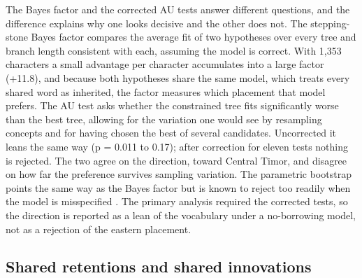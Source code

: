 \documentclass[11pt]{article}
\begin{document}
The Bayes factor and the corrected AU tests answer different questions, and the difference explains why one looks decisive and the other does not. The stepping-stone Bayes factor compares the average fit of two hypotheses over every tree and branch length consistent with each, assuming the model is correct. With 1,353 characters a small advantage per character accumulates into a large factor (+11.8), and because both hypotheses share the same model, which treats every shared word as inherited, the factor measures which placement that model prefers. The AU test asks whether the constrained tree fits significantly worse than the best tree, allowing for the variation one would see by resampling concepts and for having chosen the best of several candidates. Uncorrected it leans the same way (p = 0.011 to 0.17); after correction for eleven tests nothing is rejected. The two agree on the direction, toward Central Timor, and disagree on how far the preference survives sampling variation. The parametric bootstrap \citep[the Swofford--Olsen--Waddell--Hillis or SOWH test;][]{goldman2000} points the same way as the Bayes factor but is known to reject too readily when the model is misspecified \citep{buckley2002,susko2014}. The primary analysis required the corrected tests, so the direction is reported as a lean of the vocabulary under a no-borrowing model, not as a rejection of the eastern placement.

\subsection{Shared retentions and shared innovations}
\end{document}
